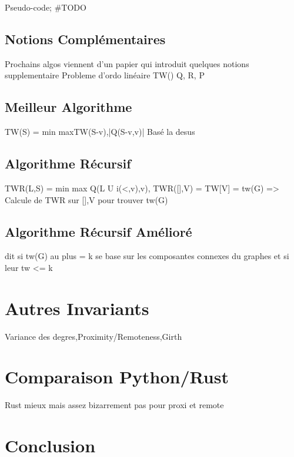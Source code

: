 \documentclass[a4paper, 12pt]{article}
\begin{document}
Pseudo-code;
\#TODO

\subsection{Notions Complémentaires}
Prochains algos viennent d'un papier qui introduit quelques notions supplementaire
Probleme d'ordo linéaire
TW()
Q, R, P
\subsection{Meilleur Algorithme}
TW(S) = min max{TW(S-{v}),|Q(S-{v},v)|}
Basé la desus
\subsection{Algorithme Récursif}
TWR(L,S) = min max Q(L U i(<,v),v),
TWR([],V) = TW[V] = tw(G)
=> Calcule de TWR sur [],V pour trouver tw(G)
\subsection{Algorithme Récursif Amélioré}
dit si tw(G) au plus = k
se base sur les composantes connexes du graphes et si leur tw <= k

\section{Autres Invariants}
Variance des degres,Proximity/Remoteness,Girth
\section{Comparaison Python/Rust}
Rust mieux mais assez bizarrement pas pour proxi et remote
\section{Conclusion}
\end{document}
